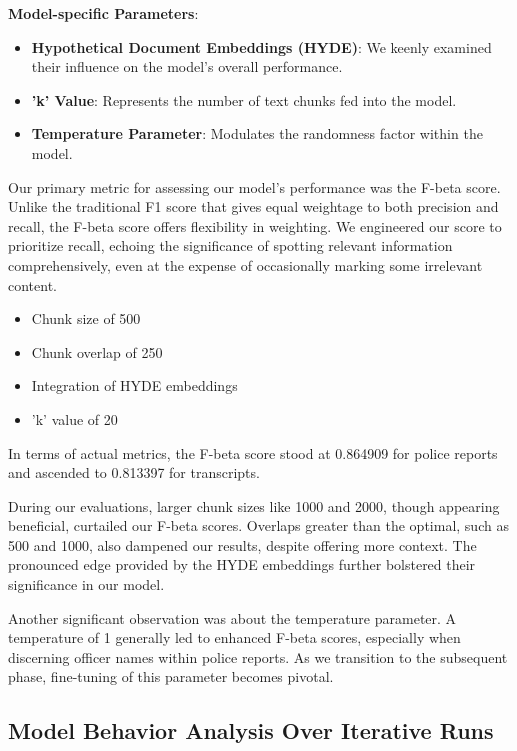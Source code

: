 \documentclass{article}
\begin{document}
\noindent \textbf{Model-specific Parameters}:
\begin{itemize}
    \item \textbf{Hypothetical Document Embeddings (HYDE)}: We keenly examined their influence on the model's overall performance.
    \item \textbf{'k' Value}: Represents the number of text chunks fed into the model.
    \item \textbf{Temperature Parameter}: Modulates the randomness factor within the model.
\end{itemize}

Our primary metric for assessing our model's performance was the F-beta score. Unlike the traditional F1 score that gives equal weightage to both precision and recall, the F-beta score offers flexibility in weighting. We engineered our score to prioritize recall, echoing the significance of spotting relevant information comprehensively, even at the expense of occasionally marking some irrelevant content.

\begin{itemize}
    \item Chunk size of 500
    \item Chunk overlap of 250
    \item Integration of HYDE embeddings
    \item 'k' value of 20
\end{itemize}

In terms of actual metrics, the F-beta score stood at 0.864909 for police reports and ascended to 0.813397 for transcripts.

During our evaluations, larger chunk sizes like 1000 and 2000, though appearing beneficial, curtailed our F-beta scores. Overlaps greater than the optimal, such as 500 and 1000, also dampened our results, despite offering more context. The pronounced edge provided by the HYDE embeddings further bolstered their significance in our model.

Another significant observation was about the temperature parameter. A temperature of 1 generally led to enhanced F-beta scores, especially when discerning officer names within police reports. As we transition to the subsequent phase, fine-tuning of this parameter becomes pivotal.

\subsection{Model Behavior Analysis Over Iterative Runs}
\end{document}
